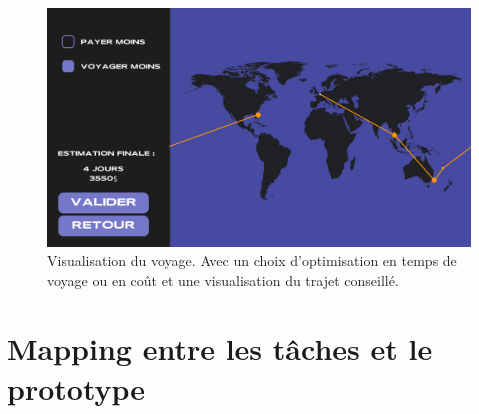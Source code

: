 \documentclass{article}
\begin{document}
\begin{figure}[!h]
	\centering
	\includegraphics[width=14.4cm]{assets/prototype/basse/onglet5}
	\caption{Visualisation du voyage. Avec un choix d'optimisation en temps de voyage ou en coût et une visualisation du trajet conseillé.}
	\label{onglet5}
\end{figure}

\section{Mapping entre les tâches et le prototype}
\end{document}
